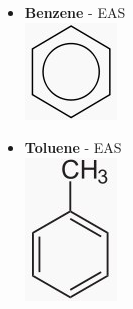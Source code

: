 \documentclass[10pt,landscape]{article}
\begin{document}
\begin{multicols*}{3}
\begin{scriptsize}
\begin{itemize}
    \item \textbf{Benzene} - EAS\\
      \includegraphics[scale=0.25]{allowed/benzene.jpg}
    \item \textbf{Toluene} - EAS\\
      \includegraphics[scale=0.25]{allowed/toluene.jpg}
    \end{itemize}
  \end{scriptsize}
\end{multicols*}
\end{document}
